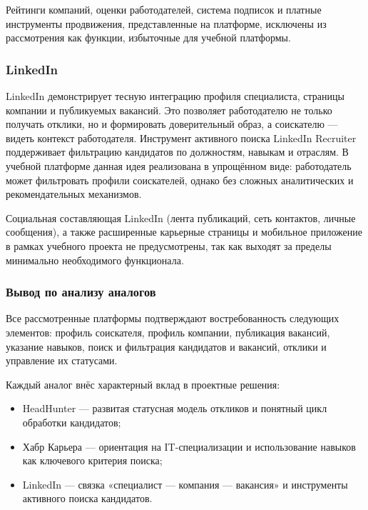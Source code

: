 Рейтинги компаний, оценки работодателей, система подписок и платные инструменты продвижения, представленные на платформе, исключены из рассмотрения как функции, избыточные для учебной платформы.

\subsubsection{LinkedIn}

LinkedIn демонстрирует тесную интеграцию профиля специалиста, страницы компании и публикуемых вакансий. Это позволяет работодателю не только получать отклики, но и формировать доверительный образ, а соискателю --- видеть контекст работодателя. Инструмент активного поиска LinkedIn Recruiter поддерживает фильтрацию кандидатов по должностям, навыкам и отраслям. В учебной платформе данная идея реализована в упрощённом виде: работодатель может фильтровать профили соискателей, однако без сложных аналитических и рекомендательных механизмов.

Социальная составляющая LinkedIn (лента публикаций, сеть контактов, личные сообщения), а также расширенные карьерные страницы и мобильное приложение в рамках учебного проекта не предусмотрены, так как выходят за пределы минимально необходимого функционала.

\subsubsection{Вывод по анализу аналогов}

Все рассмотренные платформы подтверждают востребованность следующих элементов: профиль соискателя, профиль компании, публикация вакансий, указание навыков, поиск и фильтрация кандидатов и вакансий, отклики и управление их статусами.

Каждый аналог внёс характерный вклад в проектные решения:
\begin{itemize}
	\item HeadHunter --- развитая статусная модель откликов и понятный цикл обработки кандидатов;
	\item Хабр Карьера --- ориентация на IT-специализации и использование навыков как ключевого критерия поиска;
	\item LinkedIn --- связка «специалист --- компания --- вакансия» и инструменты активного поиска кандидатов.
\end{itemize}


